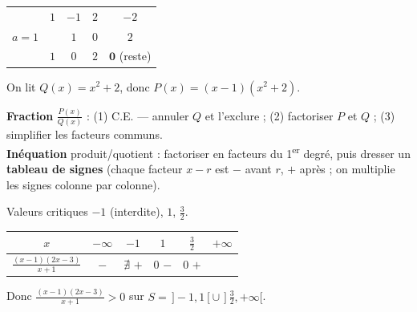 \documentclass[11pt,a4paper]{article}
\begin{document}
\begin{exemplebox}[Horner sur $P(x)=x^{3}-x^{2}+2x-2$, racine $a=1$]
\begin{center}\renewcommand{\arraystretch}{1.25}
\begin{tabular}{c|cccc}
 & $1$ & $-1$ & $2$ & $-2$\\
$a=1$ & & $1$ & $0$ & $2$\\ \hline
 & $1$ & $0$ & $2$ & $\mathbf{0}$ (reste)
\end{tabular}
\end{center}
On lit $Q(x)=x^{2}+2$, donc $P(x)=(x-1)(x^{2}+2)$.
\end{exemplebox}

\begin{methode}
\textbf{Fraction} $\tfrac{P(x)}{Q(x)}$ : (1) C.E. — annuler $Q$ et l'exclure ; (2) factoriser $P$ et $Q$ ;
(3) simplifier les facteurs communs.\\
\textbf{Inéquation} produit/quotient : factoriser en facteurs du 1\textsuperscript{er} degré, puis dresser
un \textbf{tableau de signes} (chaque facteur $x-r$ est $-$ avant $r$, $+$ après ; on multiplie les
signes colonne par colonne).
\end{methode}

\begin{exemplebox}
Valeurs critiques $-1$ (interdite), $1$, $\tfrac32$.
\begin{center}\renewcommand{\arraystretch}{1.2}\small
\begin{tabular}{c|ccccc}
$x$ & $-\infty$ & $-1$ & $1$ & $\tfrac32$ & $+\infty$\\ \hline
$\tfrac{(x-1)(2x-3)}{x+1}$ & $-$ & $\nexists$ $+$ & $0$ $-$ & $0$ $+$ &
\end{tabular}
\end{center}
Donc $\tfrac{(x-1)(2x-3)}{x+1}>0$ sur $S=\,]-1,1[\cup\,]\tfrac32,+\infty[$.
\end{exemplebox}
\end{document}
